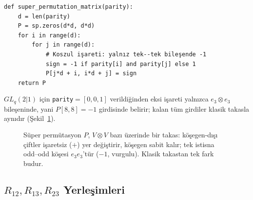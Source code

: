 \documentclass[10pt]{math}
\numberwithin{equation}{section}
\theoremstyle{plain}
\theoremstyle{definition}
\begin{document}
\begin{lstlisting}[style=pyblock,caption={$V \otimes V$ üzerinde süper permütasyon matrisi}]
def super_permutation_matrix(parity):
    d = len(parity)
    P = sp.zeros(d*d, d*d)
    for i in range(d):
        for j in range(d):
            # Koszul işareti: yalnız tek--tek bileşende -1
            sign = -1 if parity[i] and parity[j] else 1
            P[j*d + i, i*d + j] = sign
    return P
\end{lstlisting}

$GL_q(2|1)$ için \texttt{parity}$=[0,0,1]$ verildiğinden eksi işareti yalnızca
$e_3\otimes e_3$ bileşeninde, yani $P[8,8]=-1$ girdisinde belirir; kalan tüm
girdiler klasik takasla aynıdır (Şekil~\ref{fig:superperm}).

\begin{figure}[h]
\centering
{}
\caption{Süper permütasyon $P$, $V\otimes V$ bazı üzerinde bir takas: köşegen-dışı
çiftler işaretsiz ($+$) yer değiştirir, köşegen sabit kalır; tek istisna
odd--odd köşesi $e_3e_3$'tür ($-1$, vurgulu). Klasik takastan tek fark budur.}
\label{fig:superperm}
\end{figure}

\subsection{$R_{12}, R_{13}, R_{23}$ Yerleşimleri}
\end{document}
